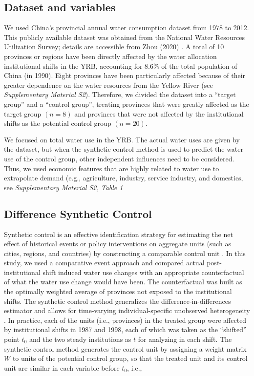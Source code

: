 \documentclass{../nsr}
\begin{document}
\subsection{Dataset and variables}
We used China’s provincial annual water consumption dataset from 1978 to 2012. This publicly available dataset was obtained from the National Water Resources Utilization Survey; details are accessible from Zhou (2020)
\cite{zhou2020}.
A total of 10 provinces or regions have been directly affected by the water allocation institutional shifts in the YRB, accounting for $8.6\%$ of the total population of China (in 1990). Eight provinces have been particularly affected because of their greater dependence on the water resources from the Yellow River (see \textit{Supplementary Material S2}). Therefore, we divided the dataset into a “target group” and a “control group”, treating provinces that were greatly affected as the target group $(n=8)$ and provinces that were not affected by the institutional shifts as the potential control group $(n=20)$.

We focused on total water use in the YRB. The actual water uses are given by the dataset, but when the synthetic control method is used to predict the water use of the control group, other independent influences need to be considered. Thus, we used economic features that are highly related to water use to extrapolate demand (e.g., agriculture, industry, service industry, and domestics, see \textit{Supplementary Material S2, Table 1}

\subsection{Difference Synthetic Control}
Synthetic control is an effective identification strategy for estimating the net effect of historical events or policy interventions on aggregate units (such as cities, regions, and countries) by constructing a comparable control unit \cite{abadie2010, abadie2015, hill2021}.
In this study, we used a comparative event approach and compared actual post-institutional shift induced water use changes with an appropriate counterfactual of what the water use change would have been.
The counterfactual was built as the optimally weighted average of provinces not exposed to the institutional shifts.
The synthetic control method generalizes the difference-in-differences estimator and allows for time-varying individual-specific unobserved heterogeneity \cite{billmeier2013, smith2015}.
In practice, each of the units (i.e., provinces) in the treated group were affected by institutional shifts in 1987 and 1998, each of which was taken as the “shifted” point $t_0$ and the two steady institutions as $t$ for analyzing in each shift. The synthetic control method generates the control unit by assigning a weight matrix $W$ to units of the potential control group, so that the treated unit and its control unit are similar in each variable before $t_0$, i.e.,
\end{document}
